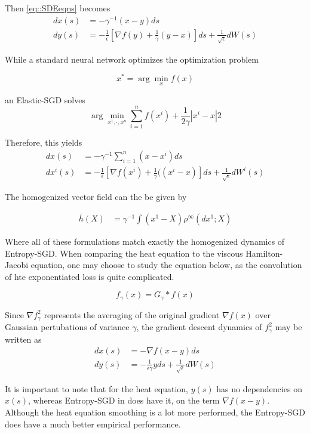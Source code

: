 Then \ref{eq::SDEeqns} becomes
\begin{align}
    dx(s) &=  -\gamma^{-1} (x-y) ds \nonumber \nonumber \\
    dy(s) &= -\frac{1}{\epsilon} \left[ \nabla f(y) + \frac{1}{\gamma} (y-x)\right] ds + \frac{1}{\sqrt{\epsilon}} dW(s) \label{EntropySGD}
\end{align}

While a standard neural network optimizes the optimization problem

$$ x^* = \arg \min_x f(x)$$

an Elastic-SGD solves
$$\arg \min_{x^1,\cdot,x^n } \sum_{i=1}^n f(x^i) + \frac{1}{2\gamma} |x^i - x | 2 $$

Therefore, this yields
\begin{align}
    dx(s) &=  -\gamma^{-1} \sum_{i=1}^n (x-x^i) ds \nonumber \\
    dx^i(s) &= - \frac{1}{\epsilon} \left[ \nabla f(x^i) + \frac{1}{\gamma} ((x^i-x)\right] ds + \frac{1}{\sqrt{\epsilon}} dW^i (s)
\end{align}

The homogenized vector field can the be given by

\begin{align*}
    \bar{h}(X) &= \gamma^{-1} \int (x^1 - X) \rho^\infty(dx^1; X)
\end{align*}

Where all of these formulations match exactly the homogenized dynamics of Entropy-SGD. When comparing the heat equation to the viscous Hamilton-Jacobi equation, one may choose to study the equation below, as the convolution of hte exponentiated loss is quite complicated.

$$f_\gamma(x) = G_\gamma * f(x) $$

Since $\nabla f_\gamma ^2$ represents the averaging of the original gradient $\nabla f(x)$ over Gaussian pertubations of variance $\gamma$, the gradient descent dynamics of $f_\gamma^2$ may be written as
\begin{align*}
    dx(s) &= - \nabla f(x-y) ds \\
    dy(s) &= - \frac{1}{\epsilon \gamma} y ds + \frac{1}{\sqrt{\epsilon}} dW(s)
\end{align*}

It is important to note that for the heat equation, $y(s)$ has no dependencies on $x(s)$, whereas Entropy-SGD in does have it, on the term $\nabla f(x-y)$. Although the heat equation smoothing is a lot more performed, the Entropy-SGD does have a much better empirical performance.

